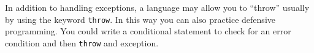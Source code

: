 In addition to handling exceptions, a language may allow you
to ``throw'' usually by using the keyword \texttt{throw}.
In this way you can also practice defensive programming.
You could write a conditional statement to check for an error
condition and then \texttt{throw} and exception.



